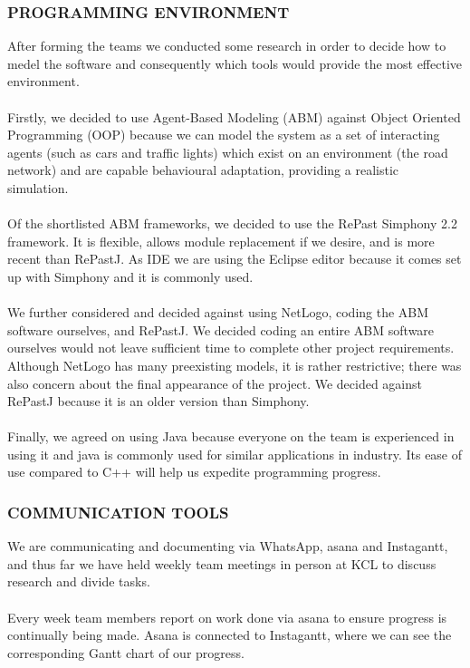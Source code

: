 \documentclass[11pt]{article}
\begin{document}
\subsubsection*{PROGRAMMING ENVIRONMENT}

After forming the teams we conducted some research in order to decide how to medel the software and consequently which tools would provide the most effective environment.
\\ \\
Firstly, we decided to use Agent-Based Modeling (ABM) against Object Oriented Programming (OOP) because we can model the system as a set of interacting agents (such as cars and traffic lights) which exist on an environment (the road network) and are capable behavioural adaptation, providing a realistic simulation.
\\ \\
Of the shortlisted ABM frameworks, we decided to use the RePast Simphony 2.2 framework. It is flexible, allows module replacement if we desire, and is more recent than RePastJ. As IDE we are using the Eclipse editor because it comes set up with Simphony and it is commonly used.
\\ \\
We further considered and decided against using NetLogo, coding the ABM software ourselves, and RePastJ. 
We decided coding an entire ABM software ourselves would not leave sufficient time to complete other project requirements. Although NetLogo has many preexisting models, it is rather restrictive; there was also concern about the final appearance of the project.
We decided against RePastJ because it is an older version than Simphony.
\\ \\
Finally, we agreed on using Java because everyone on the team is experienced in using it and java is commonly used for similar applications in industry.
Its ease of use compared to C++ will help us expedite programming progress.

\subsubsection*{COMMUNICATION TOOLS}

We are communicating and documenting via WhatsApp, asana and Instagantt, and thus 
far we have held weekly team meetings in person at KCL to discuss research and divide tasks.
\\ \\
Every week team members report on work done via asana to ensure progress is continually being made. Asana is connected to Instagantt, where we can see the corresponding Gantt chart of our progress.
\end{document}
